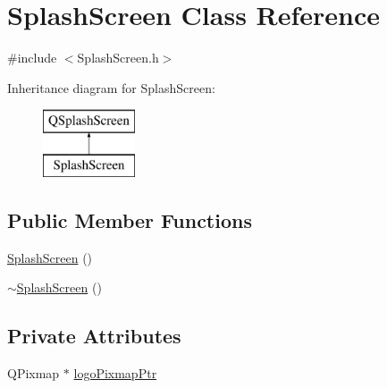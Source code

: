\hypertarget{class_splash_screen}{\section{Splash\-Screen Class Reference}
\label{class_splash_screen}
}


{\ttfamily \#include $<$Splash\-Screen.\-h$>$}

Inheritance diagram for Splash\-Screen\-:\begin{figure}[H]
\begin{center}
\leavevmode
\includegraphics[height=2.000000cm]{class_splash_screen}
\end{center}
\end{figure}
\subsection*{Public Member Functions}
\begin{DoxyCompactItemize}
\item 
\hyperlink{class_splash_screen_af7cda68255a26779cb49fd7a26d11492}{Splash\-Screen} ()
\item 
\hyperlink{class_splash_screen_aeb6a4736f6f7b9bb880d606610c2ae1e}{$\sim$\-Splash\-Screen} ()
\end{DoxyCompactItemize}
\subsection*{Private Attributes}
\begin{DoxyCompactItemize}
\item 
Q\-Pixmap $\ast$ \hyperlink{class_splash_screen_af98b9d8aba6546a8c9ee627a9edb3bd8}{logo\-Pixmap\-Ptr}
\end{DoxyCompactItemize}


